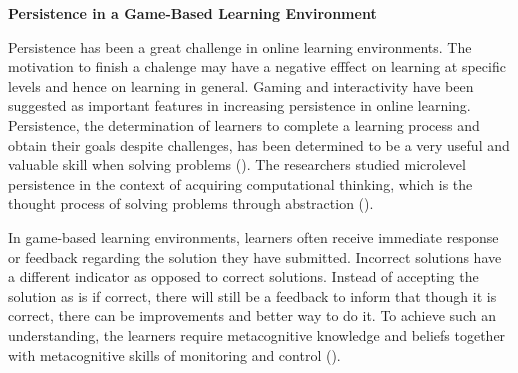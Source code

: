 \flushleft
\textbf{Persistence in a Game-Based Learning Environment}\\
\justifying

\parx
Persistence has been a great challenge in online learning environments.
The motivation to finish a chalenge may have a negative efffect on learning at
specific levels and hence on learning in general. Gaming and interactivity
have been suggested as important features in increasing persistence in online
learning. Persistence, the determination of learners to complete a learning
process and obtain their goals despite challenges, has been determined to be a
very useful and valuable skill when solving problems (\cite{dicerbo_2016}).
The researchers studied microlevel persistence in the context of acquiring
computational thinking, which is the thought process of solving problems through
abstraction (\cite{codemonkey_2020}).

\parx
In game-based learning environments, learners often receive immediate response
or feedback regarding the solution they have submitted. Incorrect solutions have
a different indicator as opposed to correct solutions. Instead of accepting
the solution as is if correct, there will still be a feedback to inform that
though it is correct, there can be improvements and better way to do it. To
achieve such an understanding, the learners require metacognitive knowledge and
beliefs together with metacognitive skills of monitoring and control (\cite{ishida_2002}).
